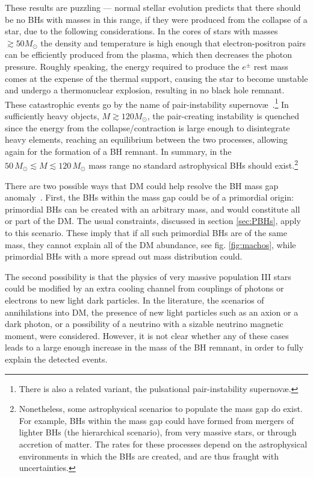 These results are puzzling --- normal stellar evolution predicts that there should be no BHs with masses in this range, if they were produced from the collapse of a star, due to the following considerations. In the cores of stars  with masses $\gtrsim 50 M_\odot$ the density and temperature is high enough that electron-positron pairs can be efficiently produced from the plasma, which then decreases the photon pressure. Roughly speaking, the energy required to produce the $e^\pm$ rest mass  comes at the expense of the thermal support, causing the star to become unstable and undergo a thermonuclear explosion,  resulting in no black hole remnant. These catastrophic events go by the name of pair-instability supernov\ae~\cite{pairinstability}.\footnote{There is also a related variant, the pulsational pair-instability supernov\ae.} In sufficiently heavy objects, $M\gtrsim 120 M_\odot$, the pair-creating instability is quenched since the energy from the collapse/contraction is large enough to disintegrate heavy elements, reaching an equilibrium between the two processes, allowing again for the formation of a BH remnant.
In summary,  in the  $ 50 \, M_\odot \lesssim M\lesssim 120 \, M_\odot$ mass range  no standard astrophysical BHs should exist.\footnote{Nonetheless, some astrophysical scenarios to populate the mass gap do exist. For example, BHs within the mass gap could have formed from mergers of lighter BHs (the hierarchical scenario), from very massive stars, or through accretion of matter. The rates for these processes depend on the astrophysical environments in which the BHs are created, and are thus fraught with uncertainties.}

\medskip

There are two possible ways that DM could help resolve the BH mass gap 
anomaly~\cite{DMandBHmassgap}. First, the BHs within the mass gap could be of a primordial origin: primordial BHs can be created with an arbitrary mass,
and would constitute all or part of the DM. The usual constraints, discussed in section \ref{sec:PBHs}, apply to this scenario. These imply that if all such primordial BHs are of the same mass, they cannot explain all of the DM abundance, see fig. \ref{fig:machos}, while primordial BHs with a more spread out mass distribution could.


The second possibility  is that the physics of very massive population III stars could be modified by an extra cooling channel from couplings of photons or electrons to new light dark particles. In the literature, the scenarios of annihilations into DM, the presence of new light particles such as an axion or a dark photon, or a possibility of a neutrino with a sizable neutrino magnetic moment, were considered. However, it is not clear whether any of these cases leads to a large enough increase in the mass of the BH remnant, in order to fully explain the detected events.


